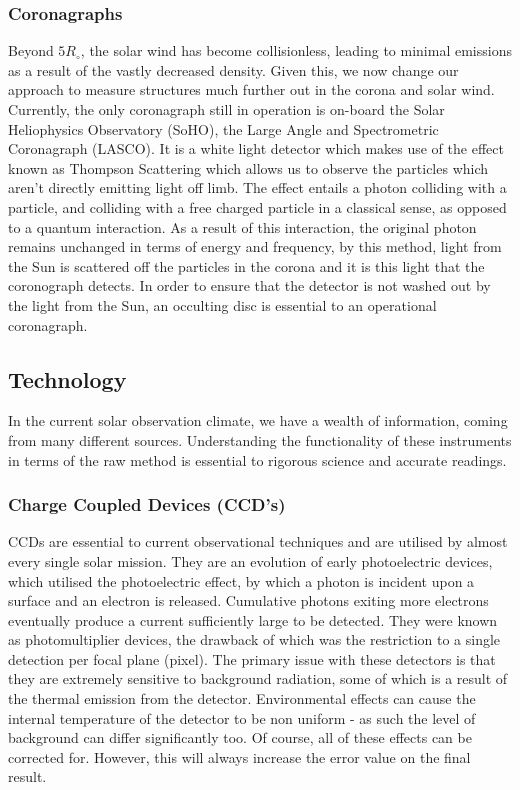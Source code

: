 \subsubsection{Coronagraphs}

Beyond $5 R_\circ$, the solar wind has become collisionless, leading to minimal emissions as a result of the vastly decreased density.
Given this, we now change our approach to measure structures much further out in the corona and solar wind.
Currently, the only coronagraph still in operation is on-board the Solar Heliophysics Observatory (SoHO), the Large Angle and Spectrometric Coronagraph (LASCO). 
It is a white light detector which makes use of the effect known as Thompson Scattering which allows us to observe the particles which aren't directly emitting light off limb.
The effect entails a photon colliding with a particle, and colliding with a free charged particle in a classical sense, as opposed to a quantum interaction.
As a result of this interaction, the original photon remains unchanged in terms of energy and frequency, by this method, light from the Sun is scattered off the particles in the corona and it is this light that the coronograph detects.
In order to ensure that the detector is not washed out by the light from the Sun, an occulting disc is essential to an operational coronagraph.


\subsection{Technology}

In the current solar observation climate, we have a wealth of information, coming from many different sources.
Understanding the functionality of these instruments in terms of the raw method is essential to rigorous science and accurate readings.

\subsubsection{Charge Coupled Devices (CCD's)}

CCDs are essential to current observational techniques and are utilised by almost every single solar mission.
They are an evolution of early photoelectric devices, which utilised the photoelectric effect, by which a photon is incident upon a surface and an electron is released.
Cumulative photons exiting more electrons eventually produce a current sufficiently large to be detected.
They were known as photomultiplier devices, the drawback of which was the restriction to a single detection per focal plane (pixel).
The primary issue with these detectors is that they are extremely sensitive to background radiation, some of which is a result of the thermal emission from the detector.
Environmental effects can cause the internal temperature of the detector to be non uniform - as such the level of background can differ significantly too.
Of course, all of these effects can be corrected for.
However, this will always increase the error value on the final result.

